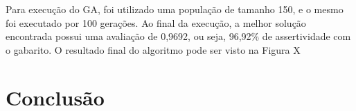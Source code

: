 \documentclass[12pt,oneside,a4paper,english,french,spanish,brazil,]{abntex2}
\begin{document}
Para execução do GA, foi utilizado uma população de tamanho 150, e o mesmo foi executado por 100 gerações. Ao final da execução, a melhor solução encontrada possui uma avaliação de 0,9692, ou seja, 96,92\% de assertividade com o gabarito. O resultado final do algoritmo pode ser visto na Figura X



% 

\chapter*[Conclusão]{Conclusão}

\lipsum[31-33]

\postextual






\printindex
\end{document}
